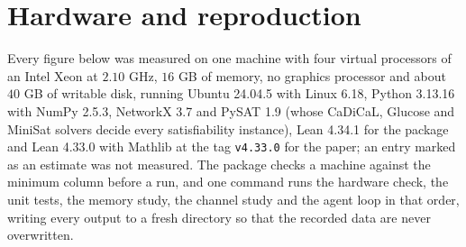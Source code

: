 \section{Hardware and reproduction}\label{app:hardware}

Every figure below was measured on one machine with four virtual processors of an Intel Xeon at $2.10$ GHz, $16$ GB of memory, no graphics processor and about $40$ GB of writable disk, running Ubuntu 24.04.5 with Linux 6.18, Python 3.13.16 with NumPy 2.5.3, NetworkX 3.7 and PySAT 1.9 (whose CaDiCaL, Glucose and MiniSat solvers decide every satisfiability instance), Lean 4.34.1 for the package and Lean 4.33.0 with Mathlib at the tag \texttt{v4.33.0} for the paper; an entry marked as an estimate was not measured. The package checks a machine against the minimum column before a run, and one command runs the hardware check, the unit tests, the memory study, the channel study and the agent loop in that order, writing every output to a fresh directory so that the recorded data are never overwritten.

